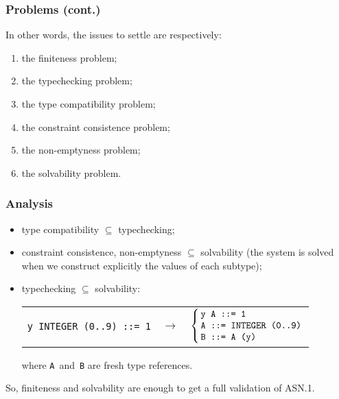 \documentclass[compress,dvips,xcolor={dvipsnames},t]{beamer}
\newcommand\ASN{\textsf{ASN.1}\xspace}
\begin{document}
\begin{frame}
\frametitle{Problems (cont.)}

In other words, the issues to settle are respectively:
\begin{enumerate}

  \item the finiteness problem;
 
  \item the typechecking problem;

  \item the type compatibility problem;

  \item the constraint consistence problem;

  \item the non-emptyness problem;

  \item the solvability problem.

\end{enumerate}

\end{frame}

\begin{frame}
\frametitle{Analysis}

\begin{itemize}

  \item type compatibility $\subseteq$ typechecking;

  \item constraint consistence, non-emptyness $\subseteq$ solvability
        (the system is solved when we construct explicitly the values
        of each subtype);

  \item typechecking $\subseteq$ solvability:
\begin{tabular}{@{}r@{\,}c@{\,}l@{}}
   \texttt{y INTEGER (0..9) ::= 1}
   & $\rightarrow$ 
   & $\left\{
       \begin{tabular}{@{\,}l@{}} 
           \texttt{y A ::= 1} \\
           \texttt{A ::= INTEGER (0..9)} \\
           \texttt{B ::= A (y)}
        \end{tabular}
     \right.$
\end{tabular}
where \texttt{A}~and~\texttt{B} are fresh type references.

\end{itemize}

So, finiteness and solvability are enough to get a full validation of
\ASN.

\end{frame}
\end{document}
